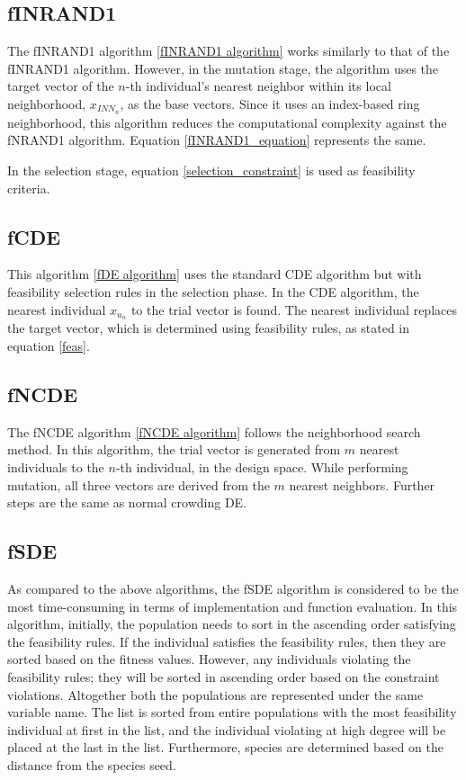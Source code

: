 \subsection{fINRAND1}
The fINRAND1 algorithm \ref{fINRAND1 algorithm} works similarly to that of the fINRAND1 algorithm. However, in the mutation stage, the algorithm uses the target vector of the \(n\)-th individual’s nearest neighbor within its local neighborhood, $x_{INN_n}$, as the base vectors. Since it uses an index-based ring neighborhood, this algorithm reduces the computational complexity against the fNRAND1 algorithm. Equation \ref{fINRAND1_equation} represents the same.

In the selection stage, equation \ref{selection_constraint} is used as feasibility criteria.


\subsection{fCDE}
This algorithm \ref{fDE algorithm} uses the standard CDE algorithm but with feasibility selection rules in the selection phase. In the CDE algorithm, the nearest individual $ {x}_{u_{n}} $ to the trial vector is found. The nearest individual replaces the target vector, which is determined using feasibility rules, as stated in equation \ref{feas}.




\subsection{fNCDE}
The fNCDE algorithm \ref{fNCDE algorithm} follows the neighborhood search method. In this algorithm, the trial vector is generated from $m$ nearest individuals to the $n$-th individual, in the design space. While performing mutation, all three vectors are derived from the $m$ nearest neighbors. Further steps are the same as normal crowding DE.


\subsection{fSDE}
As compared to the above algorithms, the fSDE algorithm is considered to be the most time-consuming in terms of implementation and function evaluation. In this algorithm, initially, the population needs to sort in the ascending order satisfying the feasibility rules. If the individual satisfies the feasibility rules, then they are sorted based on the fitness values. However, any individuals violating the feasibility rules; they will be sorted in ascending order based on the constraint violations. Altogether both the populations are represented under the same variable name. The list is sorted from entire populations with the most feasibility individual at first in the list, and the individual violating at high degree will be placed at the last in the list. Furthermore, species are determined based on the distance from the species seed.  

